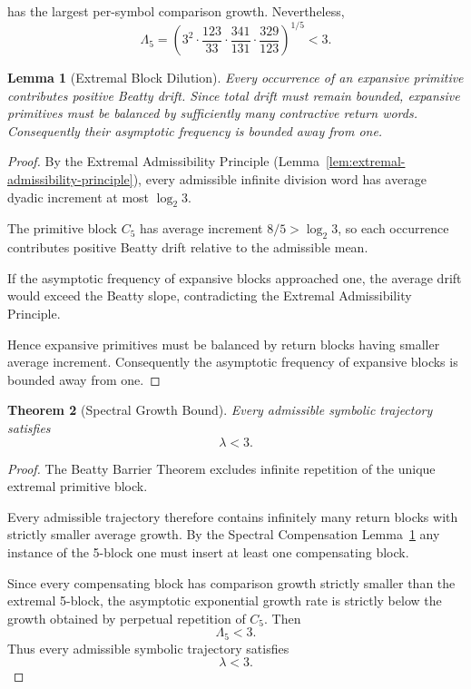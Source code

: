 \documentclass[12pt, oneside]{article}
\numberwithin{equation}{section}
\theoremstyle{definition}
\theoremstyle{plain}
\newtheorem{theorem}{Theorem}[section]
\newtheorem{lemma}[theorem]{Lemma}
\theoremstyle{remark}
\begin{document}
has the largest per-symbol comparison growth.  Nevertheless,
\[
\Lambda_5 = \left( 3^2 \cdot
\frac{123}{33} \cdot
\frac{341}{131} \cdot
\frac{329}{123}
\right)^{1/5} < 3.
\]

\begin{lemma}[Extremal Block Dilution]
\label{lem:extremal-block-dilution}
Every occurrence of an expansive primitive contributes positive Beatty drift.
Since total drift must remain bounded, expansive primitives must be balanced
by sufficiently many contractive return words. Consequently their asymptotic
frequency is bounded away from one.
\end{lemma}

\begin{proof}
By the Extremal Admissibility Principle
(Lemma~\ref{lem:extremal-admissibility-principle}),
every admissible infinite division word has average dyadic increment at most
\(\log_2 3\).

The primitive block \(C_5\) has average increment \(8/5>\log_2 3\), so each
occurrence contributes positive Beatty drift relative to the admissible mean.

If the asymptotic frequency of expansive blocks approached one, the average
drift would exceed the Beatty slope, contradicting the Extremal Admissibility
Principle.

Hence expansive primitives must be balanced by return blocks having smaller
average increment. Consequently the asymptotic frequency of expansive blocks
is bounded away from one.
\end{proof}

\begin{theorem}[Spectral Growth Bound]
\label{thm:spectral-growth}
Every admissible symbolic trajectory satisfies
\[
\lambda < 3.
\]
\end{theorem}

\begin{proof}
The Beatty Barrier Theorem excludes infinite repetition of the unique
extremal primitive block.

Every admissible trajectory therefore contains infinitely many return
blocks with strictly smaller average growth.  By the Spectral Compensation
Lemma~\ref{lem:extremal-block-dilution} any instance of the 5-block one must
insert at least one compensating block.

Since every compensating block has comparison growth strictly smaller than
the extremal 5-block, the asymptotic exponential growth rate is strictly
below the growth obtained by perpetual repetition of \(C_5\).  Then
\[
\Lambda_5<3.
\]
Thus every admissible symbolic trajectory satisfies
\[
\lambda<3.
\]
\end{proof}
\end{document}
